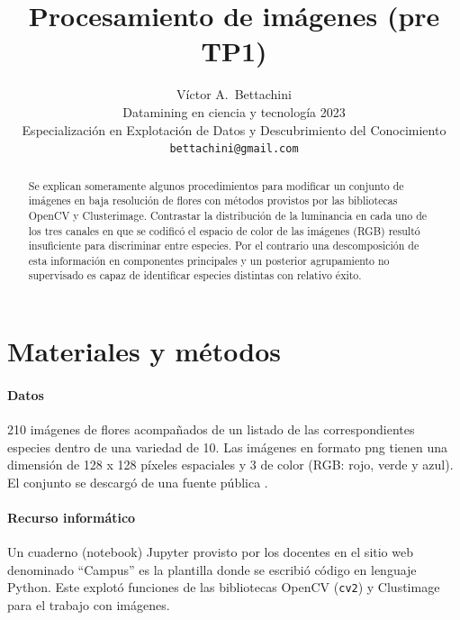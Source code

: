 \documentclass{article}
\title{Procesamiento de imágenes (pre TP1)}
\author{
  Víctor A.~Bettachini\\ %
  Datamining en ciencia y tecnología 2023\\
  Especialización en Explotación de Datos y Descubrimiento del Conocimiento\\
  \texttt{bettachini@gmail.com}
}
\begin{document}
\maketitle


\begin{abstract}
	Se explican someramente algunos procedimientos para modificar un conjunto de imágenes en baja resolución de flores con métodos provistos por las bibliotecas OpenCV y Clusterimage.
	Contrastar la distribución de la luminancia en cada uno de los tres canales en que se codificó el espacio de color de las imágenes (RGB) resultó insuficiente para discriminar entre especies.
	Por el contrario una descomposición de esta información en componentes principales y un posterior agrupamiento no supervisado es capaz de identificar especies distintas con relativo éxito.
\end{abstract}





\section{Materiales y métodos}

\paragraph{Datos}
210 imágenes de flores acompañados de un listado de las correspondientes especies dentro de una variedad de 10.
Las imágenes en formato png tienen una dimensión de 128 x 128 píxeles espaciales y 3 de color (RGB: rojo, verde y azul).
El conjunto se descargó de una fuente pública \cite{belitskaya_flower_2020}.


\paragraph{Recurso informático} 
Un cuaderno (notebook) Jupyter provisto por los docentes en el sitio web denominado ``Campus'' \cite{kamienkowski_curso_2023} es la plantilla donde se escribió código en lenguaje Python.
Este explotó funciones de las bibliotecas OpenCV (\verb'cv2') y Clustimage para el trabajo con imágenes.
\end{document}

